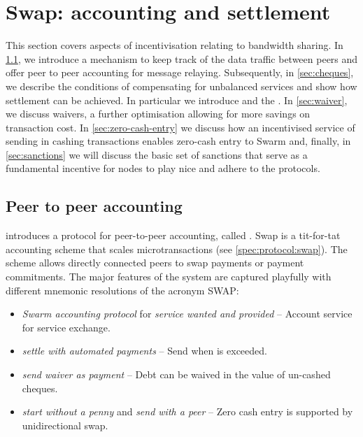 \section{Swap: accounting and settlement\statusgreen}\label{sec:accounting-and-settlement}

\green{}

This section covers aspects of incentivisation relating to bandwidth sharing. 
In \ref{sec:accounting}, we introduce a mechanism to keep track of the data traffic between peers and offer peer to peer accounting for message relaying.
Subsequently, in \ref{sec:cheques}, we describe the conditions of compensating for unbalanced services and show how settlement can be achieved.
In particular we introduce  and the . In \ref{sec:waiver}, we discuss waivers, a further optimisation allowing for more savings on transaction cost. In \ref{sec:zero-cash-entry} we discuss how an incentivised service of sending in cashing transactions enables zero-cash entry to Swarm and, finally, in \ref{sec:sanctions} we will discuss the basic set of sanctions that serve as a fundamental incentive for nodes to play nice and adhere to the protocols.

\subsection{Peer to peer accounting\statusgreen}\label{sec:accounting}


\cite{ethersphere2016sw3} introduces a protocol for peer-to-peer accounting, called . Swap is a tit-for-tat accounting scheme that scales microtransactions (see \ref{spec:protocol:swap}). The scheme allows directly connected peers to swap payments or payment commitments. The major features of the system are captured playfully with different mnemonic resolutions of the acronym SWAP:

\begin{itemize}
    \item \emph{Swarm accounting protocol} for \emph{service wanted and provided} -- Account service for service exchange.
    \item \emph{settle with automated payments} -- Send  when  is exceeded.
    \item \emph{send waiver as payment} -- Debt can be waived in the value of un-cashed cheques. 
    \item \emph{start without a penny} and \emph{send with a peer} -- Zero cash entry is supported by unidirectional swap.
\end{itemize}

